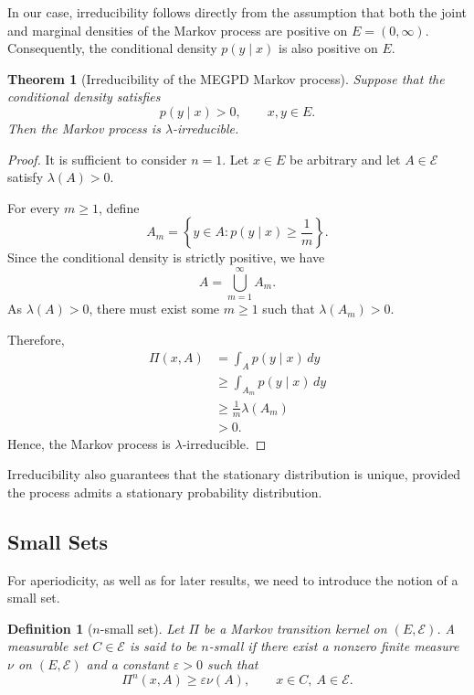 \documentclass{article}
\newtheorem{definition}{Definition}[section]
\newtheorem{theorem}[theorem]{Theorem}
\begin{document}
In our case, irreducibility follows directly from the assumption that both the joint and marginal densities of the Markov process are positive on $E=(0,\infty)$. Consequently, the conditional density $p(y \mid x)$ is also positive on $E$.

\begin{theorem}[Irreducibility of the MEGPD Markov process]
  Suppose that the conditional density satisfies
  \[
    p(y \mid x)>0,
    \qquad x,y \in E.
  \]
  Then the Markov process is $\lambda$-irreducible.
\end{theorem}

\begin{proof}
  It is sufficient to consider $n=1$. Let $x \in E$ be arbitrary and let $A \in \mathcal{E}$ satisfy $\lambda(A)>0$.

  For every $m \geq 1$, define
  \[
    A_m =
    \left\{
    y \in A :
    p(y \mid x) \geq \frac{1}{m}
    \right\}.
  \]
  Since the conditional density is strictly positive, we have
  \[
    A = \bigcup_{m=1}^{\infty} A_m.
  \]
  As $\lambda(A)>0$, there must exist some $m \geq 1$ such that $\lambda(A_m)>0$.

  Therefore,
  \[
    \begin{aligned}
      \Pi(x,A)
       & = \int_A p(y \mid x)\,dy        \\
       & \geq \int_{A_m} p(y \mid x)\,dy \\
       & \geq \frac{1}{m}\lambda(A_m)    \\
       & > 0.
    \end{aligned}
  \]
  Hence, the Markov process is $\lambda$-irreducible.
\end{proof}

Irreducibility also guarantees that the stationary distribution is unique, provided the process admits a stationary probability distribution.

\subsection{Small Sets}

For aperiodicity, as well as for later results, we need to introduce the notion of a small set.

\begin{definition}[$n$-small set]
  Let $\Pi$ be a Markov transition kernel on $(E,\mathcal{E})$. A measurable set $C \in \mathcal{E}$ is said to be $n$-small if there exist a nonzero finite measure $\nu$ on $(E,\mathcal{E})$ and a constant $\varepsilon>0$ such that
  \[
    \Pi^n(x,A)
    \geq \varepsilon \nu(A),
    \qquad x \in C,\ A \in \mathcal{E}.
  \]
\end{definition}
\end{document}
